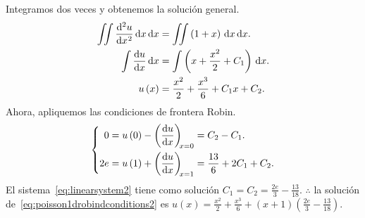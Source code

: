 \begin{solution}
      Integramos dos veces y obtenemos la solución general.
      \begin{align*}
            \iint
            \diff[2]{u}{x}
            \dl x
            \dl x           & =
            \iint
            \left(1+x\right)
            \dl x
            \dl x.              \\
            \int
            \diff{u}{x}
            \dl x           & =
            \int
            \left(x+\frac{x^{2}}{2}+C_{1}\right)
            \dl x.              \\
            u\left(x\right) & =
            \frac{x^{2}}{2}+\frac{x^{3}}{6}+C_{1}x+C_{2}.
      \end{align*}
      Ahora, apliquemos las condiciones de frontera Robin.
      \begin{equation}\label{eq:linearsystem2}
            \left\{
            \begin{aligned}
                  0
                   & =
                  u\left(0\right)-
                  \diff{u}{x}[x=0]=
                  C_{2}-C_{1}. \\
                  2e
                   & =
                  u\left(1\right)+
                  \diff{u}{x}[x=1]=
                  \frac{13}{6}+2C_{1}+C_{2}.
            \end{aligned}
            \right.
      \end{equation}
      El sistema~\eqref{eq:linearsystem2} tiene como solución
      $C_{1}=C_{2}=\frac{2e}{3}-\frac{13}{18}$.
      $\therefore$ la solución
      de~\eqref{eq:poisson1drobindconditions2} es
      \begin{math}
            u\left(x\right)=
            \frac{x^{2}}{2}+\frac{x^{3}}{6}+
            \left(x+1\right)\left(\frac{2e}{3}-\frac{13}{18}\right)
      \end{math}.
      \noQED
\end{solution}


